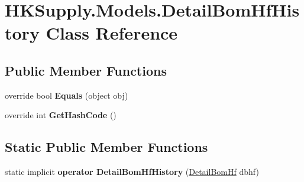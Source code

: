 \hypertarget{class_h_k_supply_1_1_models_1_1_detail_bom_hf_history}{}\section{H\+K\+Supply.\+Models.\+Detail\+Bom\+Hf\+History Class Reference}
\label{class_h_k_supply_1_1_models_1_1_detail_bom_hf_history}
\subsection*{Public Member Functions}
\begin{DoxyCompactItemize}
\item 
\mbox{\label{class_h_k_supply_1_1_models_1_1_detail_bom_hf_history_a8035c04f71f629eb68487c3b733d2e9f}} 
override bool {\bfseries Equals} (object obj)
\item 
\mbox{\label{class_h_k_supply_1_1_models_1_1_detail_bom_hf_history_a93b9ba5ac81ae41dda70a6d51c1c922c}} 
override int {\bfseries Get\+Hash\+Code} ()
\end{DoxyCompactItemize}
\subsection*{Static Public Member Functions}
\begin{DoxyCompactItemize}
\item 
\mbox{\label{class_h_k_supply_1_1_models_1_1_detail_bom_hf_history_ab260911141a048ba7672e9e44ac38066}} 
static implicit {\bfseries operator Detail\+Bom\+Hf\+History} (\mbox{\hyperlink{class_h_k_supply_1_1_models_1_1_detail_bom_hf}{Detail\+Bom\+Hf}} dbhf)
\end{DoxyCompactItemize}
